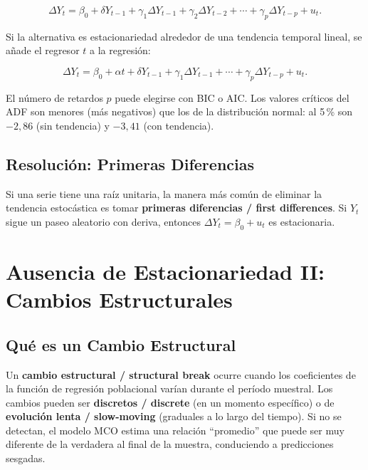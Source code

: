 \documentclass[12pt]{article}
\begin{document}
\begin{equation}
  \Delta Y_t = \beta_0 + \delta Y_{t-1} + \gamma_1 \Delta Y_{t-1} + \gamma_2 \Delta Y_{t-2}
               + \cdots + \gamma_p \Delta Y_{t-p} + u_t.
  \label{eq:adf}
\end{equation}

Si la alternativa es estacionariedad alrededor de una tendencia temporal lineal, se a\~nade el regresor $t$ a la regresi\'on:

\begin{equation}
  \Delta Y_t = \beta_0 + \alpha t + \delta Y_{t-1} + \gamma_1 \Delta Y_{t-1}
               + \cdots + \gamma_p \Delta Y_{t-p} + u_t.
  \label{eq:adft}
\end{equation}

El n\'umero de retardos $p$ puede elegirse con BIC o AIC. Los valores cr\'iticos del ADF son menores (m\'as negativos) que los de la distribuci\'on normal: al 5\,\% son $-2{,}86$ (sin tendencia) y $-3{,}41$ (con tendencia).

\subsection{Resoluci\'on: Primeras Diferencias}

Si una serie tiene una ra\'iz unitaria, la manera m\'as com\'un de eliminar la tendencia estoc\'astica es tomar \textbf{primeras diferencias / first differences}. Si $Y_t$ sigue un paseo aleatorio con deriva, entonces $\Delta Y_t = \beta_0 + u_t$ es estacionaria.

\section{Ausencia de Estacionariedad II: Cambios Estructurales}

\subsection{Qu\'e es un Cambio Estructural}

Un \textbf{cambio estructural / structural break} ocurre cuando los coeficientes de la funci\'on de regresi\'on poblacional var\'ian durante el per\'iodo muestral. Los cambios pueden ser \textbf{discretos / discrete} (en un momento espec\'ifico) o de \textbf{evoluci\'on lenta / slow-moving} (graduales a lo largo del tiempo). Si no se detectan, el modelo MCO estima una relaci\'on ``promedio'' que puede ser muy diferente de la verdadera al final de la muestra, conduciendo a predicciones sesgadas.
\end{document}
